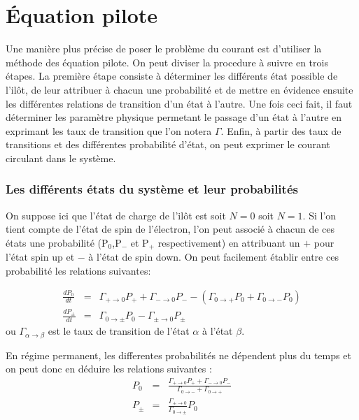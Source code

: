\section{\'Equation pilote}
Une manière plus précise de poser le problème du courant est d'utiliser la méthode des équation pilote. On peut diviser la procedure à suivre en trois étapes. La première étape consiste à déterminer les différents état possible de l'ilôt, de leur attribuer à chacun une probabilité et de mettre en évidence ensuite les différentes relations de transition d'un état à l'autre. Une fois ceci fait, il faut déterminer les paramètre physique permetant le passage d'un état à l'autre en exprimant les taux de transition que l'on notera $\Gamma$. Enfin, à partir des taux de transitions et des différentes probabilité d'état, on peut exprimer le courant circulant dans le système.

\subsubsection{Les différents états du système et leur probabilités}
On suppose ici que l'état de charge de l'ilôt est soit $N=0$ soit $N=1$. Si l'on tient compte de l'état de spin de l'électron, l'on peut associé à chacun de ces états une probabilité (P$_0$,P$_-$ et P$_+$ respectivement) en attribuant un $+$ pour l'état spin up et $-$ à l'état de spin down. On peut facilement établir entre ces probabilité les relations suivantes:

\begin{eqnarray}
\frac{dP_0}{dt} &=& \Gamma_{+ \rightarrow 0}P_+ + \Gamma_{- \rightarrow 0}P_-  -(\Gamma_{0 \rightarrow +}P_0 + \Gamma_{0 \rightarrow -}P_0) \nonumber \\
\frac{dP_\pm}{dt} &=& \Gamma_{0 \rightarrow \pm}P_0 - \Gamma_{\pm \rightarrow 0}P_\pm \nonumber
\end{eqnarray}
ou $\Gamma_{\alpha \rightarrow \beta}$ est le taux de transition de l'état $\alpha$ à l'état $\beta$. 

En régime permanent, les differentes probabilités ne dépendent plus du temps et on peut donc en déduire les relations suivantes :
\begin{eqnarray}
P_0 &=& \frac{\Gamma_{+ \rightarrow 0}P_{+} + \Gamma_{- \rightarrow 0}P_{-}}{\Gamma_{0 \rightarrow -} + \Gamma_{0 \rightarrow +} }\\
P_{\pm} &=& \frac{\Gamma_{\pm \rightarrow 0}}{\Gamma_{0 \rightarrow \pm}}P_0 
\end{eqnarray}

